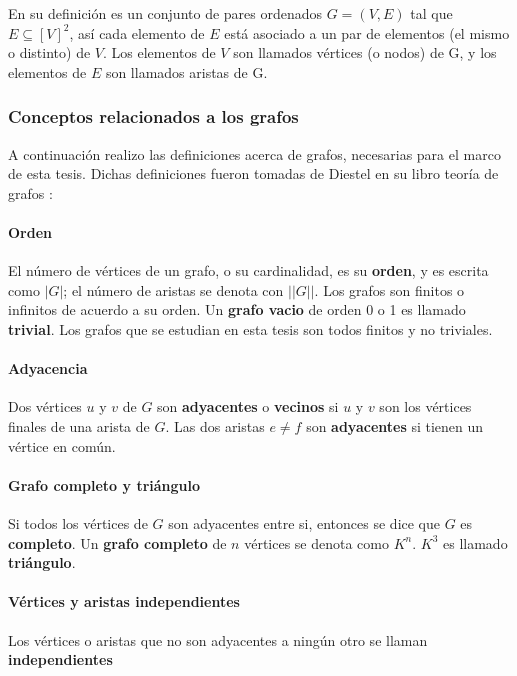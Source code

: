 En su definición es un conjunto de pares ordenados $G=(V,E)$ tal que $E\subseteq [V]^{2}$, así cada elemento de $E$ está asociado a un par de elementos (el mismo o distinto) de $V$. Los elementos de $V$ son llamados vértices (o nodos) de G, y los elementos de $E$ son llamados aristas de G.\cite{Diestel2005GraphTheory,Balakrishnan2000ATheory} 

\subsubsection{Conceptos relacionados a los grafos}

A continuación realizo las definiciones acerca de grafos, necesarias para el marco de esta tesis. Dichas definiciones fueron tomadas de Diestel en su libro teoría de grafos \cite{Diestel2005GraphTheory}:

\paragraph{Orden}
El número de vértices de un grafo, o su cardinalidad, es su \textbf{orden}, y es escrita como $|G|$; el número de aristas se denota con $||G||$. Los grafos son finitos o infinitos de acuerdo a su orden. Un \textbf{grafo vacio} de orden 0 o 1 es llamado \textbf{trivial}. Los grafos que se estudian en esta tesis son todos finitos y no triviales.

\paragraph{Adyacencia}
Dos vértices $u$ y $v$ de $G$ son \textbf{adyacentes} o \textbf{vecinos} si $u$ y $v$ son los vértices finales de una arista de $G$. Las dos aristas $e\neq f$ son \textbf{adyacentes} si tienen un vértice en común. 

\paragraph{Grafo completo y triángulo}
Si todos los vértices de $G$ son adyacentes entre si, entonces se dice que $G$ es \textbf{completo}. Un \textbf{grafo completo} de $n$ vértices se denota como $K^{n}$. $K^{3}$ es llamado \textbf{triángulo}.

\paragraph{Vértices y aristas independientes}
Los vértices o aristas que no son adyacentes a ningún otro se llaman \textbf{independientes}

